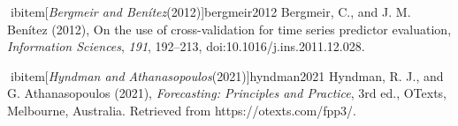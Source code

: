 \documentclass[draft]{agujournal2019}
\begin{document}
\begin{thebibliography}{99}
ibitem[\textit{Bergmeir and Ben\'{i}tez}(2012)]{bergmeir2012} Bergmeir, C., and J. M. Ben\'{i}tez (2012), On the use of cross-validation for time series predictor evaluation, \textit{Information Sciences}, \textit{191}, 192--213, doi:10.1016/j.ins.2011.12.028.

ibitem[\textit{Hyndman and Athanasopoulos}(2021)]{hyndman2021} Hyndman, R. J., and G. Athanasopoulos (2021), \textit{Forecasting: Principles and Practice}, 3rd ed., OTexts, Melbourne, Australia. Retrieved from https://otexts.com/fpp3/.
\end{thebibliography}
\end{document}
